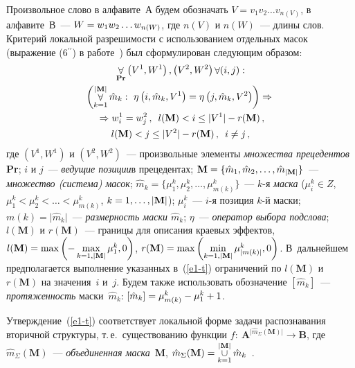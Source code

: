 \begin{multicols}{2}
Произвольное слово в алфавите~$\mathbf{А}$ будем обозначать
$V=v_1v_2\ldots v_{n(V)}$, в алфавите~$\mathbf{В}$~--- $W\hm=w_1w_2\ldots
w_{n(W)}$, где $n(V)$ и $n(W)$~--- длины слов. Критерий локальной
разрешимости с использованием отдельных масок (выражение
(6$^{\prime\prime}$) в работе~\cite{3-t}) был сформулирован следующим
образом:
\begin{multline}
\mathop{\forall}\limits_{\mathbf{Pr}} \left( V^1,W^1\right), \left(V^2,W^2\right) \mathop{\forall} (i,j):\\
 \left(
\mathop{\forall}_{k=1}^{|\mathbf{M}|}\hat{m}_k:\ \eta\left( i,\hat{m}_k,V^1\right) =\eta \left(
j,\hat{m}_k,V^2\right)\right) \Rightarrow{}\\
{}\Rightarrow w_i^1=w_j^2\,,\enskip
l(\mathbf{M})<i\leq \vert V^1\vert -r(\mathbf{M})\,,\\
l(\mathbf{M})<j\leq \vert V^2\vert -r(\mathbf{M})\,,\enskip
i\not=j\,,
\label{e1-t}
\end{multline}
где $\left(V^1,W^1\right)$ и $\left (V^2,W^2\right)$~--- произвольные элементы
\textit{множества прецедентов} \textbf{Pr}; $i$ и $j$~--- \textit{ведущие позиции}\linebreak в
прецедентах; $\mathbf{M}\hm =\{ \hat{m}_1,\hat{m}_2, \ldots , \hat{m}_{|\mathbf{M}|}\}$~---
\textit{множество (система) масок};
$\hat{m}_k=\{\mu_1^k, \mu_2^k,\ldots , \mu^k_{m(k)}\}$~--- $k$-я
\textit{маска} ($\mu_i^k\in Z$, $\mu_1^k<\mu_2^k<\ldots < \mu^k_{m(k)}$,
$k\hm=1, \ldots , \vert \mathbf{M}\vert$); $\mu_i^k$~--- $i$-я позиция $k$-й маски;\linebreak
$m(k)=\vert \hat{m}_k\vert$~--- \textit{размерность маски $\hat{m}_k$};
$\eta$~--- \textit{оператор выбора подслова}; $l(\mathbf{M})$ и $r(\mathbf{M})$~--- границы
для описания краевых эффектов, $l(\mathbf{M}) \hm=\max \left(-
\max\limits_{k=1,\vert \mathbf{M}\vert} \mu_1^k,0\right)$, $r(\mathbf{M}) \hm = \max \left(
\min\limits_{k=1,\vert \mathbf{M}\vert} \mu^k_{\vert m(k)\vert},0\right)$. В~дальнейшем
предполагается выполнение указанных в~(\ref{e1-t}) ограничений по $l(\mathbf{M})$
и $r(\mathbf{M})$ на значения~$i$ и~$j$. Будем также использовать обозначение
$[\hat{m}_k]$~--- \textit{протяженность} маски~$\hat{m}_k$:
$[\hat{m}_k]\hm= \mu^k_{m(k)}\hm-\mu_1^k\hm+1$.

Утверждение~(\ref{e1-t}) соответствует локальной форме задачи
распознавания вторичной структуры, т.\,е.\ существованию функции $f:\
\mathbf{A}^{\vert \hat{m}_\Sigma(\mathbf{M})\vert}\rightarrow \mathbf{B}$,
где $\hat{m}_\Sigma(\mathbf{M})$~---
\textit{объединенная маска}~\textbf{M}, $\hat{m}_\Sigma(\mathbf{M})\hm=\cupb\limits_{k=1}
^{\vert \mathbf{M}\vert} \hat{m}_k$~\cite{3-t}.


\end{multicols}
